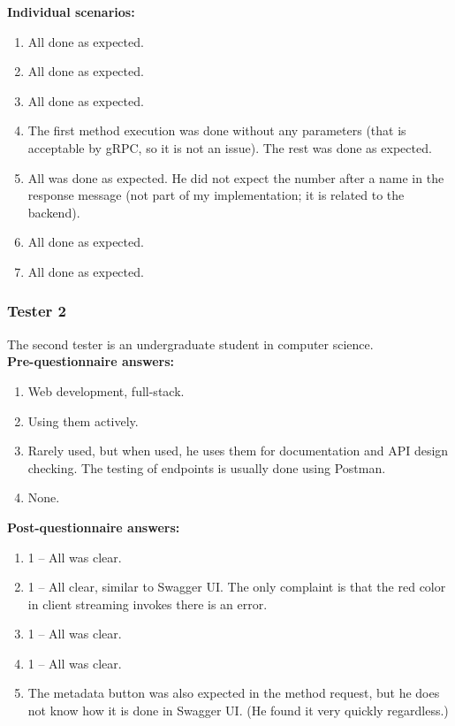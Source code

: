 \textbf{Individual scenarios:}
\begin{enumerate}
    \item All done as expected.
    \item All done as expected.
    \item All done as expected.
    \item The first method execution was done without any parameters (that is acceptable by gRPC, so it is not an issue).
    The rest was done as expected.
    \item All was done as expected.
    He did not expect the number after a name in the response message (not part of my implementation; it is related to the backend).
    \item All done as expected.
    \item All done as expected.
\end{enumerate}

\subsubsection{Tester 2}
The second tester is an undergraduate student in computer science.\\

\textbf{Pre-questionnaire answers:}
\begin{enumerate}
    \item Web development, full-stack.
    \item Using them actively.
    \item Rarely used, but when used, he uses them for documentation and API design checking.
    The testing of endpoints is usually done using Postman.
    \item None.
\end{enumerate}

\textbf{Post-questionnaire answers:}
\begin{enumerate}
    \item 1 -- All was clear.
    \item 1 -- All clear, similar to Swagger UI\@.
    The only complaint is that the red color in client streaming invokes there is an error.
    \item 1 -- All was clear.
    \item 1 -- All was clear.
    \item The metadata button was also expected in the method request, but he does not know how it is done in Swagger UI\@.
    (He found it very quickly regardless.)
\end{enumerate}

